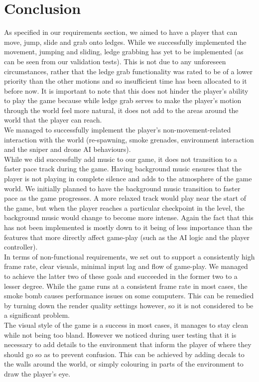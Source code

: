 \documentclass[11pt,a4paper]{article}
\begin{document}
\section{Conclusion}
As specified in our requirements section, we aimed to have a player that can move, jump, slide and grab onto ledges. While we successfully implemented the movement, jumping and sliding, ledge grabbing has yet to be implemented (as can be seen from our validation tests). This is not due to any unforeseen circumstances, rather that the ledge grab functionality was rated to be of a lower priority than the other motions and so insufficient time has been allocated to it before now.
It is important to note that this does not hinder the player's ability to play the game because while ledge grab serves to make the player's motion through the world feel more natural, it does not add to the areas around the world that the player can reach. \\
We managed to successfully implement the player's non-movement-related interaction with the world (re-spawning, smoke grenades, environment interaction and the sniper and drone AI behaviours). \\
While we did successfully add music to our game, it does not transition to a faster pace track during the game. Having background music ensures that the player is not playing in complete silence and adds to the atmosphere of the game world. We initially planned to have the background music transition to faster pace as the game progresses. A more relaxed track would play near the start of the game, but when the player reaches a particular checkpoint in the level, the background music would change to become more intense.
Again the fact that this has not been implemented is mostly down to it being of less importance than the features that more directly affect game-play (such as the AI logic and the player controller). \\
In terms of non-functional requirements, we set out to support a consistently high frame rate, clear visuals, minimal input lag and flow of game-play. We managed to achieve the latter two of these goals and succeeded in the former two to a lesser degree.
While the game runs at a consistent frame rate in most cases, the smoke bomb causes performance issues on some computers. This can be remedied by turning down the render quality settings however, so it is not considered to be a significant problem. \\
The visual style of the game is a success in most cases, it manages to stay clean while not being too bland. However we noticed during user testing that it is necessary to add details to the environment that inform the player of where they should go so as to prevent confusion. This can be achieved by adding decals to the walls around the world, or simply colouring in parts of the environment to draw the player's eye.
\end{document}

